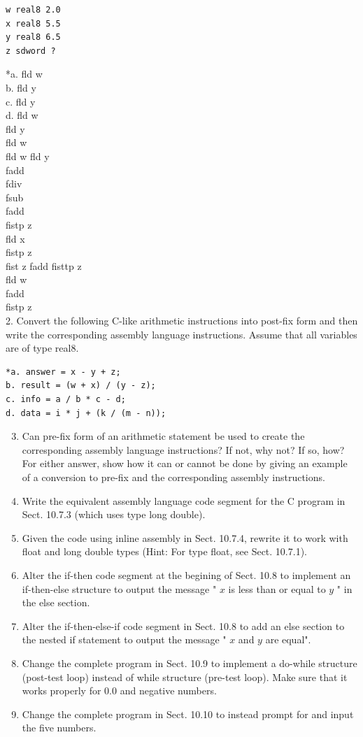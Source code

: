 \documentclass[10pt]{book}
\begin{document}
\begin{verbatim}
w real8 2.0
x real8 5.5
y real8 6.5
z sdword ?
\end{verbatim}

*a. fld w\\
b. fld y\\
c. fld y\\
d. fld w\\
fld y\\
fld w\\
fld w fld y\\
fadd\\
fdiv\\
fsub\\
fadd\\
fistp z\\
fld x\\
fistp z\\
fist z fadd fisttp z\\
fld w\\
fadd\\
fistp z\\
2. Convert the following C-like arithmetic instructions into post-fix form and then write the corresponding assembly language instructions. Assume that all variables are of type real8.

\begin{verbatim}
*a. answer = x - y + z;
b. result = (w + x) / (y - z);
c. info = a / b * c - d;
d. data = i * j + (k / (m - n));
\end{verbatim}

\begin{enumerate}
  \setcounter{enumi}{2}
  \item Can pre-fix form of an arithmetic statement be used to create the corresponding assembly language instructions? If not, why not? If so, how? For either answer, show how it can or cannot be done by giving an example of a conversion to pre-fix and the corresponding assembly instructions.
  \item Write the equivalent assembly language code segment for the C program in Sect. 10.7.3 (which uses type long double).
  \item Given the code using inline assembly in Sect. 10.7.4, rewrite it to work with float and long double types (Hint: For type float, see Sect. 10.7.1).
  \item Alter the if-then code segment at the begining of Sect. 10.8 to implement an if-then-else structure to output the message " $x$ is less than or equal to $y$ " in the else section.
  \item Alter the if-then-else-if code segment in Sect. 10.8 to add an else section to the nested if statement to output the message " $x$ and $y$ are equal".
  \item Change the complete program in Sect. 10.9 to implement a do-while structure (post-test loop) instead of while structure (pre-test loop). Make sure that it works properly for 0.0 and negative numbers.
  \item Change the complete program in Sect. 10.10 to instead prompt for and input the five numbers.
\end{enumerate}
\end{document}
